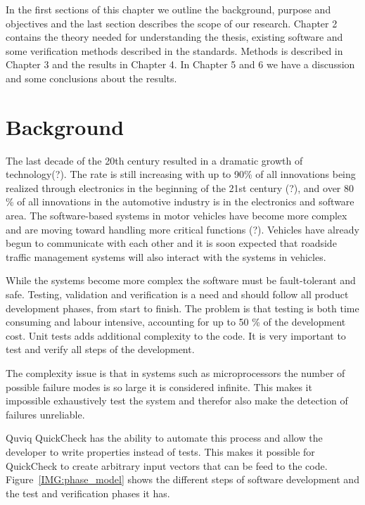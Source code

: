 In the first sections of this chapter we outline the background, purpose and
objectives and the last section describes the scope of our research. Chapter 2
contains the theory needed for understanding the thesis, existing software and
some verification methods described in the standards. Methods is described in
Chapter 3 and the results in Chapter 4. In Chapter 5 and 6 we have a discussion
and some conclusions about the results.

\section{Background}
The last decade of the 20th century resulted in a dramatic growth of
technology(?). The rate is still increasing with up to 90\% of all innovations
being realized through electronics in the beginning of the 21st century (?), and
over 80 \% of all innovations in the automotive industry is in the electronics
and software area\cite{SAFE:interoperability}. The software-based systems in
motor vehicles have become more complex and are moving toward handling more
critical functions (?). Vehicles have already begun to communicate with each
other \cite{VOLVO:convoys} and it is soon expected that roadside traffic
management systems will also interact with the systems in
vehicles\cite{SURVEY:car_communications}.

While the systems become more complex the software must be fault-tolerant and
safe. Testing, validation and verification is a need and should follow all
product development phases, from start to finish. The problem is that testing is
both time consuming and labour intensive, accounting for up to 50 \% of the
development cost\cite{QUICKCHECK:lightweight}. Unit tests adds additional
complexity to the code. It is very important to test and verify all steps of the
development.

The complexity issue is that in systems such as microprocessors the number of
possible failure modes is so large it is considered
infinite\cite{COURSEBOOK:safety-critical}. This makes it impossible exhaustively
test the system and therefor also make the detection of failures unreliable.

Quviq QuickCheck has the ability to automate this process and allow the
developer to write properties instead of tests. This makes it possible for
QuickCheck to create arbitrary input vectors that can be feed to the
code. Figure~\ref{IMG:phase_model} shows the different steps of software
development and the test and verification phases it has.

